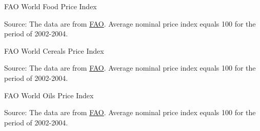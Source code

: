 \documentclass[table,xcolor=pdftex,dvipsnames]{beamer}\usepackage[]{graphicx}\usepackage[]{color}
\makeatletter
\newenvironment{kframe}{%
 \def\at@end@of@kframe{}%
 \ifinner\ifhmode%
  \def\at@end@of@kframe{\end{minipage}}%
  \begin{minipage}{\columnwidth}%
 \fi\fi%
 \def\FrameCommand##1{\hskip\@totalleftmargin \hskip-\fboxsep
 \colorbox{shadecolor}{##1}\hskip-\fboxsep
     \hskip-\linewidth \hskip-\@totalleftmargin \hskip\columnwidth}%
 \MakeFramed {\advance\hsize-\width
   \@totalleftmargin\z@ \linewidth\hsize
   \@setminipage}}%
 {\par\unskip\endMakeFramed%
 \at@end@of@kframe}
\newenvironment{knitrout}{}{} %
\makeatother
\begin{document}
\begin{frame}{FAO World Food Price Index}
\begin{knitrout}
\color{fgcolor}\begin{kframe}


{\ttfamily\noindent\bfseries\color{errorcolor}{\#\# Error in print(WorldFoodindex): object 'WorldFoodindex' not found}}\end{kframe}
\end{knitrout}
\scriptsize
Source: The data are from \href{http://www.fao.org/worldfoodsituation/foodpricesindex/en/}{FAO}. Average nominal price index equals 100 for the period of 2002-2004.
\end{frame}

\begin{frame}{FAO World Cereals Price Index}
\begin{knitrout}
\color{fgcolor}\begin{kframe}


{\ttfamily\noindent\bfseries\color{errorcolor}{\#\# Error in print(WorldCerealsindex): object 'WorldCerealsindex' not found}}\end{kframe}
\end{knitrout}
\scriptsize
Source: The data are from \href{http://www.fao.org/worldfoodsituation/wfs-home/foodpricesindex/en/}{FAO}. Average nominal price index equals 100 for the period of 2002-2004.
\end{frame}

\begin{frame}{FAO World Oils Price Index}
\begin{knitrout}
\color{fgcolor}\begin{kframe}


{\ttfamily\noindent\bfseries\color{errorcolor}{\#\# Error in print(World\_Oils\_index): object 'World\_Oils\_index' not found}}\end{kframe}
\end{knitrout}
\scriptsize
Source: The data are from \href{http://www.fao.org/worldfoodsituation/wfs-home/foodpricesindex/en/}{FAO}. Average nominal price index equals 100 for the period of 2002-2004.
\end{frame}
\end{document}
